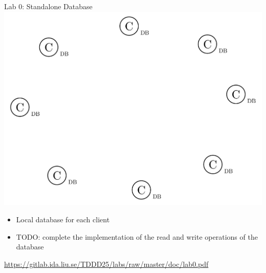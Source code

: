 \documentclass[compress,xcolor=table]{beamer}
\begin{document}
\begin{frame}{Lab 0: Standalone Database}
  \centering
  \includegraphics[scale=0.10,page=1]{include/assets/standalone-agents}
  \vspace{0.5em}
  \begin{itemize}
    \item Local database for each client
    \item \alert{TODO}: complete the implementation of the read and write
    operations of the database
  \end{itemize}
  \begin{center}
    \scriptsize \url{https://gitlab.ida.liu.se/TDDD25/labs/raw/master/doc/lab0.pdf}
  \end{center}
\end{frame}
\end{document}
